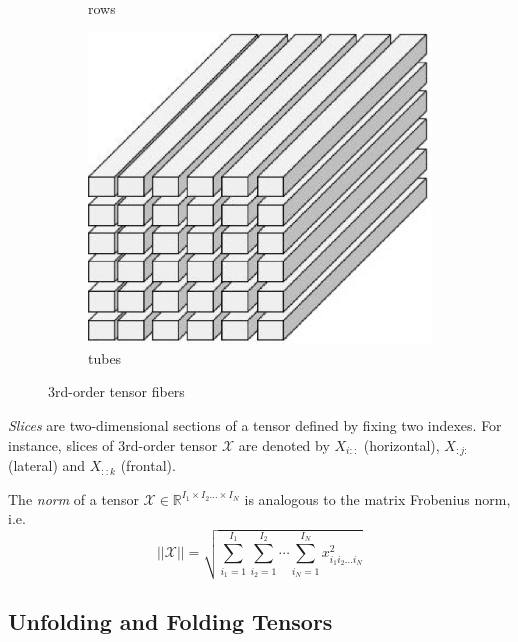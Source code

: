 \documentclass[letterpaper,12pt]{article}
\begin{document}
\begin{figure}[!ht]
\begin{subfigure}[b]{0.33\textwidth}
  \caption{rows}\label{fig:3tensor-rows}
 \end{subfigure}
 \begin{subfigure}[b]{0.33\textwidth}
  \includegraphics[width=\textwidth]{Images/3rd-order-tensor-fiber_mode-3.eps}
  \caption{tubes}\label{fig:3tensor-tubes}
 \end{subfigure}
\caption{3rd-order tensor fibers}\label{fig:3tensor-fibers}
\end{figure}

\textit{Slices} are two-dimensional sections of a tensor defined by fixing two indexes. For instance, slices of 3rd-order tensor $\mathcal{X}$ are denoted by $X_{i::}$ (horizontal), $X_{:j:}$ (lateral) and $X_{::k}$ (frontal).


The \textit{norm} of a tensor $\mathcal{X}\in \mathbb{R}^{I_1\times I_2 \ldots \times I_N}$ is analogous to the matrix Frobenius norm, i.e.
\begin{equation}
||\mathcal{X}|| = \sqrt{\sum_{i_1=1}^{I_1}\sum_{i_2=1}^{I_2}\cdots\sum_{i_N=1}^{I_N} x_{i_1i_2\ldots i_N}^2 } 
\end{equation}\label{eq:Frobenius-norm}


\subsection{Unfolding and Folding Tensors}
\end{document}
